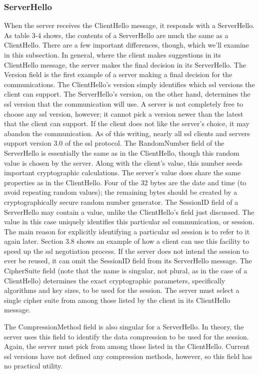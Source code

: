\subsubsection{ServerHello}
When the server receives the ClientHello message, it responds with a
ServerHello. As table 3-4 shows, the contents of a ServerHello are
much the same as a ClientHello. There are a few important differences, though, which we’ll examine in this subsection. In general,
where the client makes suggestions in its ClientHello message, the
server makes the final decision in its ServerHello.
The Version field is the first example of a server making a final decision for the communications. The ClientHello’s version simply identifies which ssl versions the client can support. The ServerHello’s
version, on the other hand, determines the ssl version that the communication will use. A server is not completely free to choose any ssl
version, however; it cannot pick a version newer than the latest that
the client can support. If the client does not like the server’s choice, it
may abandon the communication. As of this writing, nearly all ssl
clients and servers support version 3.0 of the ssl protocol.
The RandomNumber field of the ServerHello is essentially the same
as in the ClientHello, though this random value is chosen by the
server. Along with the client’s value, this number seeds important
cryptographic calculations. The server’s value does share the same
properties as in the ClientHello. Four of the 32 bytes are the date and
time (to avoid repeating random values); the remaining bytes should
be created by a cryptographically secure random number generator.
The SessionID field of a ServerHello may contain a value, unlike the
ClientHello’s field just discussed. The value in this case uniquely
identifies this particular ssl communication, or session. The main reason for explicitly identifying a particular ssl session is to refer to it
again later. Section 3.8 shows an example of how a client can use this
facility to speed up the ssl negotiation process. If the server does not
intend the session to ever be reused, it can omit the SessionID field
from its ServerHello message.
The CipherSuite field (note that the name is singular, not plural, as in
the case of a ClientHello) determines the exact cryptographic parameters, specifically algorithms and key sizes, to be used for the session. The server must select a single cipher suite from among those
listed by the client in its ClientHello message.

The CompressionMethod field is also singular for a ServerHello. In
theory, the server uses this field to identify the data compression to
be used for the session. Again, the server must pick from among
those listed in the ClientHello. Current ssl versions have not defined
any compression methods, however, so this field has no practical utility.
